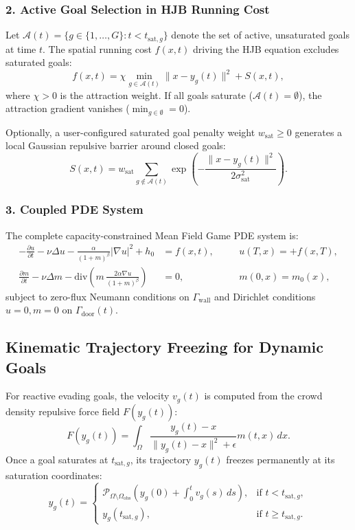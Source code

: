 \documentclass[11pt,a4paper]{article}
\begin{document}
\subsubsection{2. Active Goal Selection in HJB Running Cost}
Let $\mathcal{A}(t) = \{ g \in \{1, \dots, G\} : t < t_{\text{sat}, g} \}$ denote the set of active, unsaturated goals at time $t$. The spatial running cost $f(x, t)$ driving the HJB equation excludes saturated goals:
\begin{equation}
\label{eq:hjb_cost}
f(x, t) = \chi \min_{g \in \mathcal{A}(t)} \|x - y_g(t)\|^2 + S(x, t),
\end{equation}
where $\chi > 0$ is the attraction weight. If all goals saturate ($\mathcal{A}(t) = \emptyset$), the attraction gradient vanishes ($\min_{g \in \emptyset} = 0$).

Optionally, a user-configured saturated goal penalty weight $w_{\text{sat}} \ge 0$ generates a local Gaussian repulsive barrier around closed goals:
\begin{equation}
S(x, t) = w_{\text{sat}} \sum_{g \notin \mathcal{A}(t)} \exp\left( -\frac{\|x - y_g(t)\|^2}{2 \sigma_{\text{sat}}^2} \right).
\end{equation}

\subsubsection{3. Coupled PDE System}
The complete capacity-constrained Mean Field Game PDE system is:
\begin{align}
\label{eq:hjb_full}
-\frac{\partial u}{\partial t} - \nu \Delta u - \frac{\alpha}{(1 + m)^\beta} |\nabla u|^2 + h_0 &= f(x, t), \quad &&u(T, x) = +f(x, T), \\
\label{eq:kfp_full}
\frac{\partial m}{\partial t} - \nu \Delta m - \text{div}\left( m \, \frac{2 \alpha \nabla u}{(1 + m)^\beta} \right) &= 0, \quad &&m(0, x) = m_0(x),
\end{align}
subject to zero-flux Neumann conditions on $\Gamma_{\text{wall}}$ and Dirichlet conditions $u=0, m=0$ on $\Gamma_{\text{door}}(t)$.

\subsection{Kinematic Trajectory Freezing for Dynamic Goals}
For reactive evading goals, the velocity $v_g(t)$ is computed from the crowd density repulsive force field $F(y_g(t))$:
\begin{equation}
F(y_g(t)) = \int_{\Omega} \frac{y_g(t) - x}{\|y_g(t) - x\|^2 + \epsilon} m(t, x) \, dx.
\end{equation}
Once a goal saturates at $t_{\text{sat}, g}$, its trajectory $y_g(t)$ freezes permanently at its saturation coordinates:
\begin{equation}
y_g(t) = \begin{cases} 
\mathcal{P}_{\Omega \setminus \Omega_{\text{obs}}} \left( y_g(0) + \int_0^t v_g(s) \, ds \right), & \text{if } t < t_{\text{sat}, g}, \\[6pt]
y_g(t_{\text{sat}, g}), & \text{if } t \ge t_{\text{sat}, g}.
\end{cases}
\end{equation}
\end{document}
